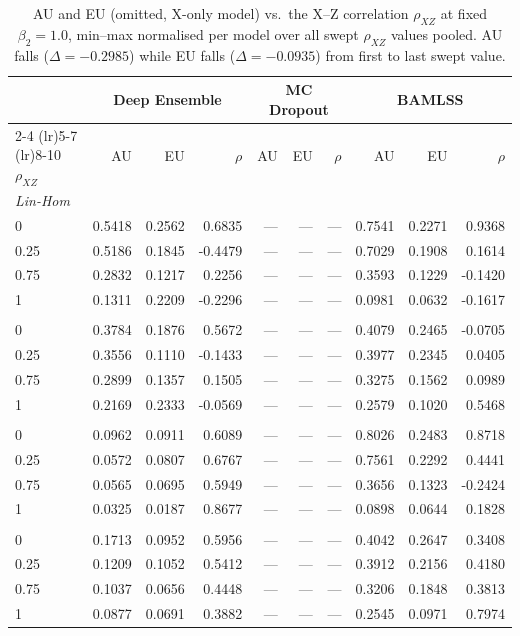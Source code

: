 \begin{table}
\centering
\small
\setlength{\tabcolsep}{4pt}
\caption{AU and EU (omitted, X-only model) vs.\ the X--Z correlation $\rho_{XZ}$ at fixed $\beta_2=1.0$, min--max normalised per model over all swept $\rho_{XZ}$ values pooled. AU falls (\ensuremath{\Delta=-0.2985}) while EU falls (\ensuremath{\Delta=-0.0935}) from first to last swept value.}
\label{tab:ovb-rho}
\begin{tabular}{lrrrrrrrrr}
\toprule
 & \multicolumn{3}{c}{Deep Ensemble} & \multicolumn{3}{c}{MC Dropout} & \multicolumn{3}{c}{BAMLSS} \\
\cmidrule(lr){2-4} \cmidrule(lr){5-7} \cmidrule(lr){8-10}
$\rho_{XZ}$ & AU & EU & $\rho$ & AU & EU & $\rho$ & AU & EU & $\rho$ \\
\midrule
\multicolumn{10}{l}{\textit{Lin-Hom}} \\
0 & 0.5418 & 0.2562 & 0.6835 & --- & --- & --- & 0.7541 & 0.2271 & 0.9368 \\
0.25 & 0.5186 & 0.1845 & -0.4479 & --- & --- & --- & 0.7029 & 0.1908 & 0.1614 \\
0.75 & 0.2832 & 0.1217 & 0.2256 & --- & --- & --- & 0.3593 & 0.1229 & -0.1420 \\
1 & 0.1311 & 0.2209 & -0.2296 & --- & --- & --- & 0.0981 & 0.0632 & -0.1617 \\
\addlinespace
\multicolumn{10}{l}{\textit{Lin-Het}} \\
0 & 0.3784 & 0.1876 & 0.5672 & --- & --- & --- & 0.4079 & 0.2465 & -0.0705 \\
0.25 & 0.3556 & 0.1110 & -0.1433 & --- & --- & --- & 0.3977 & 0.2345 & 0.0405 \\
0.75 & 0.2899 & 0.1357 & 0.1505 & --- & --- & --- & 0.3275 & 0.1562 & 0.0989 \\
1 & 0.2169 & 0.2333 & -0.0569 & --- & --- & --- & 0.2579 & 0.1020 & 0.5468 \\
\addlinespace
\multicolumn{10}{l}{\textit{Sin-Hom}} \\
0 & 0.0962 & 0.0911 & 0.6089 & --- & --- & --- & 0.8026 & 0.2483 & 0.8718 \\
0.25 & 0.0572 & 0.0807 & 0.6767 & --- & --- & --- & 0.7561 & 0.2292 & 0.4441 \\
0.75 & 0.0565 & 0.0695 & 0.5949 & --- & --- & --- & 0.3656 & 0.1323 & -0.2424 \\
1 & 0.0325 & 0.0187 & 0.8677 & --- & --- & --- & 0.0898 & 0.0644 & 0.1828 \\
\addlinespace
\multicolumn{10}{l}{\textit{Sin-Het}} \\
0 & 0.1713 & 0.0952 & 0.5956 & --- & --- & --- & 0.4042 & 0.2647 & 0.3408 \\
0.25 & 0.1209 & 0.1052 & 0.5412 & --- & --- & --- & 0.3912 & 0.2156 & 0.4180 \\
0.75 & 0.1037 & 0.0656 & 0.4448 & --- & --- & --- & 0.3206 & 0.1848 & 0.3813 \\
1 & 0.0877 & 0.0691 & 0.3882 & --- & --- & --- & 0.2545 & 0.0971 & 0.7974 \\
\bottomrule
\end{tabular}
\end{table}
